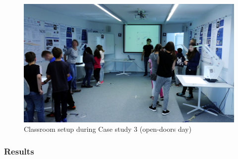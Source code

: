 \documentclass[10pt,journal,compsoc]{IEEEtran}
\begin{document}

\begin{figure}[!t]
\centering
\includegraphics[width=\linewidth]{img/Case3Picture}
\caption{Classroom setup during Case study 3 (open-doors day)}
\label{fig:case3picture}
\end{figure}


\subsubsection{Results}
\end{document}
